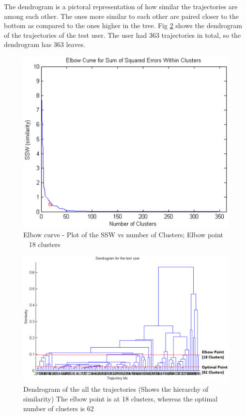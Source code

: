 The dendrogram is a pictoral representation of how similar the trajectories are among each other. The ones more similar to each other are paired closer to the bottom as compared to the ones higher in the tree. Fig \ref{fig:dendrogram} shows the dendrogram of the trajectories of the test user. The user had 363 trajectories in total, so the dendrogram has 363 leaves. 
\begin{figure}[t]
\centering     
\includegraphics[scale=0.5]{figs/new/elbow.eps}
\caption{Elbow curve - Plot of the SSW vs number of Clusters; Elbow point ~ 18 clusters}
\label{fig:elbow}  
\end{figure}
\begin{figure}
\centering     
\includegraphics[scale=0.5]{figs/new/dendrogram.eps}
\caption{Dendrogram of the all the trajectories (Shows the hierarchy of similarity) The elbow point is at 18 clusters, whereas the optimal number of clusters is 62 }
\label{fig:dendrogram}  
\end{figure}
